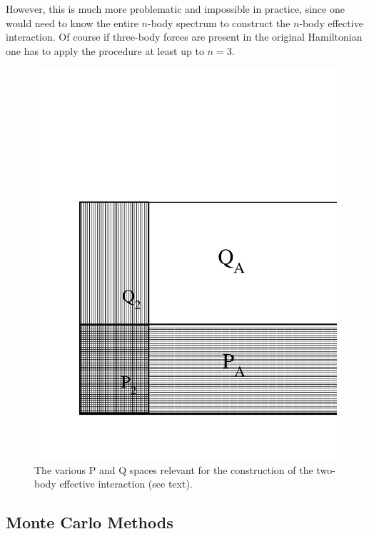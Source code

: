 However, this is much more problematic and  impossible in practice, since one would need to
know the entire $n$-body spectrum to construct the $n$-body effective interaction. 
Of course if three-body forces are present in the original Hamiltonian one has 
to apply the  procedure at least up to $n=3$.  
\begin{figure}
\sidecaption
\includegraphics[scale=.65]{Chapter7-figures/fig1.pdf}
%
%
\caption{The various P and Q spaces relevant for the construction
of the two-body effective interaction (see text).}
\label{fig:1}       %
\end{figure}

\subsection{Monte Carlo Methods}\label{sec:MC}

